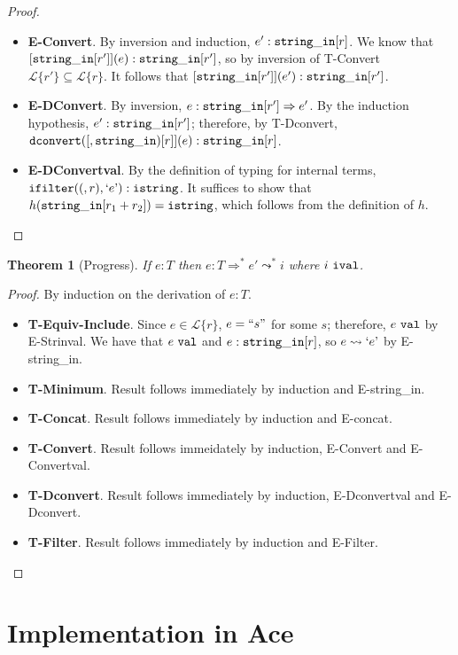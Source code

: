 \documentclass[10pt,preprint]{sigplanconf}
\newtheorem{thm}{Theorem}
\theoremstyle{definition}
\newcommand{\Lagr}{\mathcal{L}}
\newcommand{\strin}{{\tt string\_in}}
\newcommand{\lang}[1]{\Lagr\{#1\}}
\newcommand{\istr}{ {\tt istring} }
\newcommand{\dconvert}[2]{ {\tt dconvert}(#1,#2) }
\newcommand{\ifilter}[2]{ {\tt ifilter}(#1,#2) }
\newcommand{\reduces}{ \Rightarrow }
\newcommand{\ireduces}{ \leadsto }
\newcommand{\val}{ \ {\tt val} }
\newcommand{\ival}{ \ {\tt ival} }
\newcommand{\istrf}[1]{`#1\textrm'} %
\newcommand{\strf}[1]{``#1"}
\begin{document}
\begin{proof}
\begin{itemize}[label=$ $,itemsep=1ex]
  \item \textbf{E-Convert}. By inversion and induction, $e' : \strin[r]$. We know that $[\strin[r']](e) : \strin[r']$, so by inversion of T-Convert $\lang{r'} \subseteq \lang{r}$.
    It follows that $[\strin[r']](e') : \strin[r']$.
  \item \textbf{E-DConvert}. By inversion, $e : \strin[r'] \reduces e'$. By the induction hypothesis, $e' : \strin[r']$; therefore, by T-Dconvert, $\dconvert[\strin[r]](e):\strin[r]$.
  \item \textbf{E-DConvertval}. By the definition of typing for internal terms, $\ifilter(r,\istrf{e}) : \istr$. It suffices to show that $h(\strin[r_1+r_2]) = \istr$, which follows from the definition of $h$.
\end{itemize}
\end{proof}

\begin{thm}[Progress]
  If $e:T$ then $e:T \reduces^* e' \ireduces^* i$ where $i \ival$.
\end{thm}
\begin{proof}
By induction on the derivation of $e:T$.
\begin{itemize}[label=$ $,itemsep=1ex]
  \item \textbf{T-Equiv-Include}. Since $e \in \lang{r}$, $e = \strf{s}$ for some $s$; therefore, $e \val$ by E-Strinval. 
    We have that $e \val$ and $e : \strin[r]$, so $e \ireduces \istrf{e}$ by E-string\_in.
  \item \textbf{T-Minimum}. Result follows immediately by induction and E-string\_in.
  \item \textbf{T-Concat}. Result follows immediately by induction and E-concat.
  \item \textbf{T-Convert}. Result follows immeidately by induction, E-Convert and E-Convertval.
  \item \textbf{T-Dconvert}. Result follows immediately by induction, E-Dconvertval and E-Dconvert.
  \item \textbf{T-Filter}. Result follows immediately by induction and E-Filter.
\end{itemize}
\end{proof}

\section{Implementation in Ace}
\end{document}
